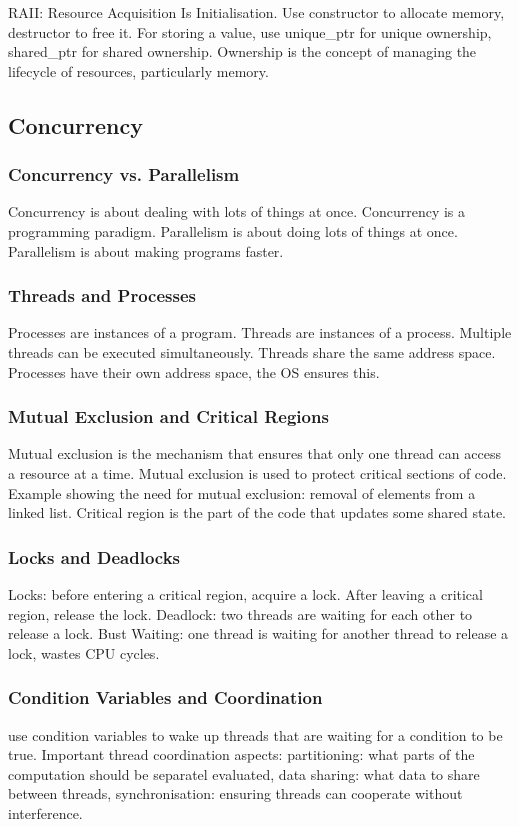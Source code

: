 \documentclass{article}
\begin{document}
RAII: Resource Acquisition Is Initialisation.
Use constructor to allocate memory, destructor to free it.
For storing a value, use unique\_ptr for unique ownership, shared\_ptr for shared ownership.
Ownership is the concept of managing the lifecycle of resources, particularly memory.

\subsection*{Concurrency}

\subsubsection*{Concurrency vs. Parallelism}
Concurrency is about dealing with lots of things at once.
Concurrency is a programming paradigm.
Parallelism is about doing lots of things at once.
Parallelism is about making programs faster.

\subsubsection*{Threads and Processes}
Processes are instances of a program.
Threads are instances of a process.
Multiple threads can be executed simultaneously.
Threads share the same address space.
Processes have their own address space, the OS ensures this.

\subsubsection*{Mutual Exclusion and Critical Regions}
Mutual exclusion is the mechanism that ensures that only one thread can access a resource at a time.
Mutual exclusion is used to protect critical sections of code.
Example showing the need for mutual exclusion: removal of elements from a linked list.
Critical region is the part of the code that updates some shared state.

\subsubsection*{Locks and Deadlocks}
Locks: before entering a critical region, acquire a lock.
After leaving a critical region, release the lock.
Deadlock: two threads are waiting for each other to release a lock.
Bust Waiting: one thread is waiting for another thread to release a lock, wastes CPU cycles.

\subsubsection*{Condition Variables and Coordination}
use condition variables to wake up threads that are waiting for a condition to be true.
Important thread coordination aspects:
partitioning: what parts of the computation should be separatel evaluated,
data sharing: what data to share between threads,
synchronisation: ensuring threads can cooperate without interference.
\end{document}

